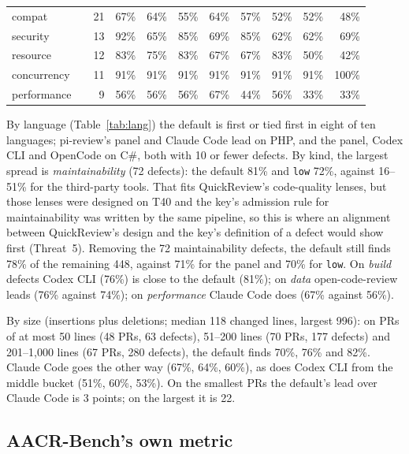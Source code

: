 \documentclass[11pt,a4paper]{article}
\newcommand{\qcr}{QuickReview}
\newcommand{\code}[1]{\texttt{#1}}
\begin{document}
\begin{table}[tbp]
{\begin{tabular}{lrrrrrrrrrr}
    compat & & 21 & 67\% & 64\% & 55\% & 64\% & 57\% & 52\% & 52\% & 48\% \\
    security & & 13 & 92\% & 65\% & 85\% & 69\% & 85\% & 62\% & 62\% & 69\% \\
    resource & & 12 & 83\% & 75\% & 83\% & 67\% & 67\% & 83\% & 50\% & 42\% \\
    concurrency & & 11 & 91\% & 91\% & 91\% & 91\% & 91\% & 91\% & 91\% & 100\% \\
    performance & & 9 & 56\% & 56\% & 56\% & 67\% & 44\% & 56\% & 33\% & 33\% \\
    \bottomrule
  \end{tabular}}
\end{table}

By language (Table~\ref{tab:lang}) the default is first or tied first in
eight of ten languages; pi-review's panel and Claude Code lead on PHP, and
the panel, Codex CLI and OpenCode on C\#, both with 10 or fewer defects. By
kind, the largest spread is \emph{maintainability} (72 defects): the default
81\% and \code{low} 72\%, against 16--51\% for the third-party tools. That
fits \qcr{}'s code-quality lenses, but those lenses were designed on T40 and
the key's admission rule for maintainability was written by the same
pipeline, so this is where an alignment between \qcr{}'s design and the
key's definition of a defect would show first (Threat~5). Removing the 72
maintainability defects, the default still finds 78\% of the remaining 448,
against 71\% for the panel and 70\% for \code{low}. On \emph{build} defects
Codex CLI (76\%) is close to the default (81\%); on \emph{data}
open-code-review leads (76\% against 74\%); on \emph{performance} Claude Code
does (67\% against 56\%).

By size (insertions plus deletions; median 118 changed lines, largest 996):
on PRs of at most 50 lines (48 PRs, 63 defects), 51--200 lines (70 PRs, 177
defects) and 201--1{,}000 lines (67 PRs, 280 defects), the default finds
70\%, 76\% and 82\%. Claude Code goes the other way (67\%, 64\%, 60\%), as
does Codex CLI from the middle bucket (51\%, 60\%, 53\%). On the smallest PRs
the default's lead over Claude Code is 3 points; on the largest it is 22.

\subsection{AACR-Bench's own metric}
\end{document}

